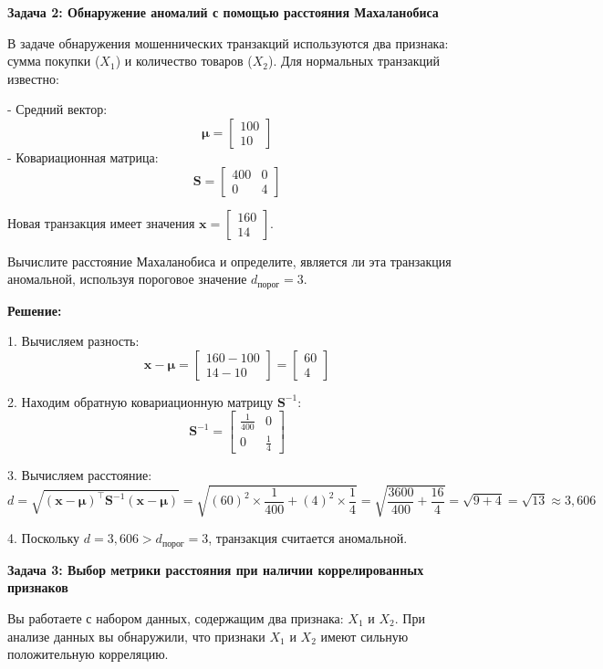\textbf{Задача 2: Обнаружение аномалий с помощью расстояния Махаланобиса}

В задаче обнаружения мошеннических транзакций используются два признака: сумма покупки (\( X_1 \)) и количество товаров (\( X_2 \)). Для нормальных транзакций известно:

- Средний вектор:
  \[
  \mathbf{\mu} = \begin{bmatrix} 100 \\ 10 \end{bmatrix}
  \]
- Ковариационная матрица:
  \[
  \mathbf{S} = \begin{bmatrix} 400 & 0 \\ 0 & 4 \end{bmatrix}
  \]

Новая транзакция имеет значения \( \mathbf{x} = \begin{bmatrix} 160 \\ 14 \end{bmatrix} \).

Вычислите расстояние Махаланобиса и определите, является ли эта транзакция аномальной, используя пороговое значение \( d_{\text{порог}} = 3 \).

\textbf{Решение:}

1. Вычисляем разность:
\[
\mathbf{x} - \mathbf{\mu} = \begin{bmatrix} 160 - 100 \\ 14 - 10 \end{bmatrix} = \begin{bmatrix} 60 \\ 4 \end{bmatrix}
\]

2. Находим обратную ковариационную матрицу \( \mathbf{S}^{-1} \):
\[
\mathbf{S}^{-1} = \begin{bmatrix} \frac{1}{400} & 0 \\ 0 & \frac{1}{4} \end{bmatrix}
\]

3. Вычисляем расстояние:
\[
d = \sqrt{ (\mathbf{x} - \mathbf{\mu})^\top \mathbf{S}^{-1} (\mathbf{x} - \mathbf{\mu}) } = \sqrt{ (60)^2 \times \frac{1}{400} + (4)^2 \times \frac{1}{4} } = \sqrt{ \frac{3600}{400} + \frac{16}{4} } = \sqrt{9 + 4} = \sqrt{13} \approx 3{,}606
\]

4. Поскольку \( d = 3{,}606 > d_{\text{порог}} = 3 \), транзакция считается аномальной.

\textbf{Задача 3: Выбор метрики расстояния при наличии коррелированных признаков}

Вы работаете с набором данных, содержащим два признака: \( X_1 \) и \( X_2 \). При анализе данных вы обнаружили, что признаки \( X_1 \) и \( X_2 \) имеют сильную положительную корреляцию.


